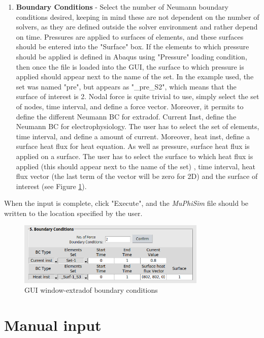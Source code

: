 \documentclass[oneside,11pt,times]{book}
\begin{document}
\begin{enumerate}
\item\textbf{Boundary Conditions} - Select the number of Neumann boundary conditions desired, keeping in mind these are not dependent on the number of solvers, as they are defined outside the solver environment and rather depend on time. Pressures are applied to surfaces of elements, and these surfaces should be entered into the "Surface" box. If the elements to which pressure should be applied is defined in Abaqus using "Pressure" loading condition, then once the file is loaded into the GUI, the surface to which pressure is applied should appear next to the name of the set. In the example used, the set was named "pre", but appears as "\_pre\_S2", which means that the surface of interest is 2. Nodal force is quite trivial to use, simply select the set of nodes, time interval, and define a force vector. Moreover, it permits to define the different Neumann BC for extradof. Current Inst, define the Neumann BC for electrophysiology. The user has to select the set of elements, time interval, and define a amount of current. Moreover, heat inst, define a surface heat flux for heat equation. As well as pressure, surface heat flux is applied on a surface. The user has to select the surface to which heat flux is applied (this should appear next to the name of the set) , time interval, heat flux vector (the last term of the vector will be zero for 2D) and the surface of interest (see Figure \ref{fig:GUIWindow-EXTRADOF}).

\end{enumerate}
When the input is complete, click "Execute", and the \textit{MuPhiSim} file should be written to the location specified by the user.
\begin{figure}[h!]
    \centering
    \includegraphics[width=0.8\textwidth]{imgs/UserManual/GUI-EXTRADOF.png}
    \caption{GUI window-extradof boundary conditions}
    \label{fig:GUIWindow-EXTRADOF}
\end{figure}

\section{Manual input}
\end{document}
